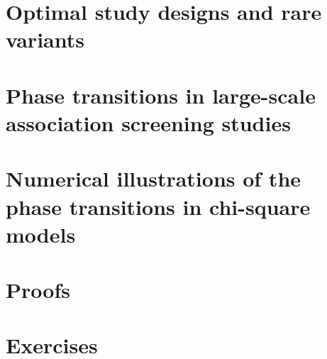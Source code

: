 \section{Optimal study designs and rare variants}
\label{sec:optimal-design} 



\section{Phase transitions in large-scale association screening studies}
\label{sec:phase-transitions-in-GWAS}



\section{Numerical illustrations of the phase transitions in chi-square models}
\label{sec:numerical}



\section{Proofs}
\label{sec:proof-signal-size-odds-ratio}



\section{Exercises}
\label{sec:Exercises-GWAS}

